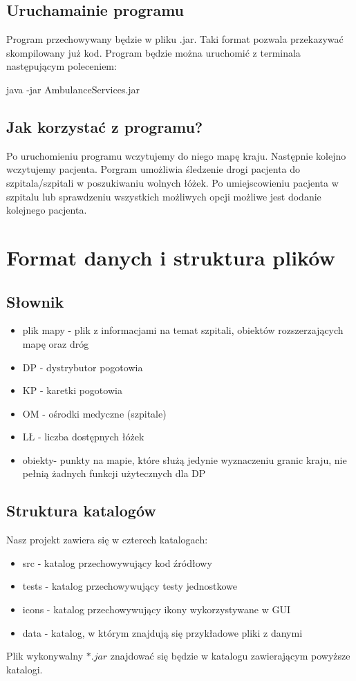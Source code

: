 \documentclass{article}
\begin{document}
\subsection{Uruchamainie programu}
Program przechowywany będzie w pliku .jar. Taki format pozwala przekazywać skompilowany już kod. Program będzie można uruchomić z terminala następującym poleceniem:

java -jar AmbulanceServices.jar 

\subsection{Jak korzystać z programu?}
Po uruchomieniu programu wczytujemy do niego mapę kraju. Następnie kolejno wczytujemy pacjenta. Porgram umożliwia śledzenie drogi pacjenta do szpitala/szpitali w poszukiwaniu wolnych łóżek. Po umiejscowieniu pacjenta w szpitalu lub sprawdzeniu wszystkich możliwych opcji możliwe jest dodanie kolejnego pacjenta.

\section{Format danych i struktura plików}
\subsection{Słownik}
\begin{itemize}
    \item plik mapy - plik z informacjami na temat szpitali, obiektów rozszerzających mapę oraz dróg
    \item DP - dystrybutor pogotowia
    \item KP - karetki pogotowia
    \item OM - ośrodki medyczne
    (szpitale)
    \item LŁ - liczba dostępnych łóżek
    \item obiekty- punkty na mapie, które służą jedynie wyznaczeniu granic kraju, nie pełnią żadnych funkcji użytecznych dla DP
\end{itemize}
\subsection{Struktura katalogów}
Nasz projekt zawiera się w czterech katalogach:
\begin{itemize}
    \item src - katalog przechowywujący kod źródłowy
    \item tests - katalog przechowywujący testy jednostkowe
    \item icons - katalog przechowywujący ikony wykorzystywane w GUI
    \item data - katalog, w którym znajdują się przykładowe pliki z danymi
\end{itemize}
Plik wykonywalny $*.jar$ znajdować się będzie w katalogu zawierającym powyższe katalogi.
\end{document}
